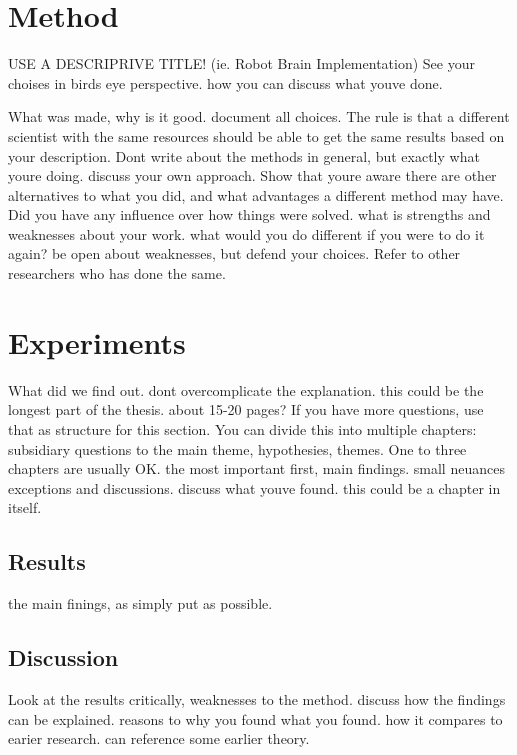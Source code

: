 \documentclass[UKenglish,twoside,12pt]{report}     %
\begin{document}
\chapter{Method}
USE A DESCRIPRIVE TITLE! (ie. Robot Brain Implementation)
See your choises in birds eye perspective. how you can discuss what youve done.

What was made, why is it good. document all choices. The rule is that a different scientist with the same resources should be able to get the same results based on your description. Dont write about the methods in general, but exactly what youre doing. discuss your own approach. Show that youre aware there are other alternatives to what you did, and what advantages a different method may have. Did you have any influence over how things were solved. what is strengths and weaknesses about your work. what would you do different if you were to do it again? be open about weaknesses, but defend your choices. Refer to other researchers who has done the same. 
\chapter{Experiments}                     %
What did we find out. dont overcomplicate the explanation. this could be the longest part of the thesis. about 15-20 pages? If you have more questions, use that as structure for this section. You can divide this into multiple chapters: subsidiary questions to the main theme, hypothesies, themes. One to three chapters are usually OK. the most important first, main findings. small neuances exceptions and discussions. discuss what youve found. this could be a chapter in itself.
\section{Results}
the main finings, as simply put as possible.
\section{Discussion}
Look at the results critically, weaknesses to the method. discuss how the findings can be explained. reasons to why you found what you found. how it compares to earier research. can reference some earlier theory.
\end{document}
